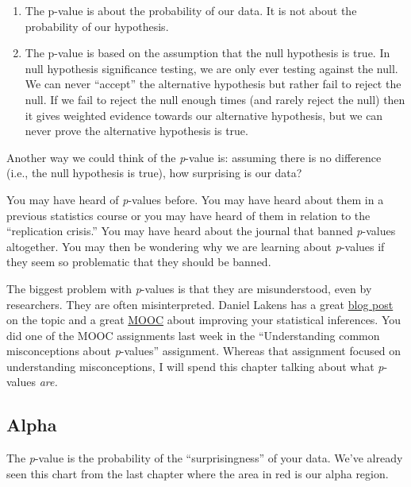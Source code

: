 \documentclass[
]{book}
\providecommand{\tightlist}{%
  \setlength{\itemsep}{0pt}\setlength{\parskip}{0pt}}
\begin{document}
\begin{enumerate}
\def\labelenumi{\arabic{enumi}.}
\tightlist
\item
  The p-value is about the probability of our data. It is not about the probability of our hypothesis.
\item
  The p-value is based on the assumption that the null hypothesis is true. In null hypothesis significance testing, we are only ever testing against the null. We can never ``accept'' the alternative hypothesis but rather fail to reject the null. If we fail to reject the null enough times (and rarely reject the null) then it gives weighted evidence towards our alternative hypothesis, but we can never prove the alternative hypothesis is true.
\end{enumerate}

Another way we could think of the \emph{p}-value is: assuming there is no difference (i.e., the null hypothesis is true), how surprising is our data?

You may have heard of \emph{p}-values before. You may have heard about them in a previous statistics course or you may have heard of them in relation to the ``replication crisis.'' You may have heard about the journal that banned \emph{p}-values altogether. You may then be wondering why we are learning about \emph{p}-values if they seem so problematic that they should be banned.

The biggest problem with \emph{p}-values is that they are misunderstood, even by researchers. They are often misinterpreted. Daniel Lakens has a great \href{http://daniellakens.blogspot.com/2017/12/understanding-common-misconceptions.html}{blog post} on the topic and a great \href{https://www.coursera.org/learn/statistical-inferences}{MOOC} about improving your statistical inferences. You did one of the MOOC assignments last week in the ``Understanding common misconceptions about \emph{p}-values'' assignment. Whereas that assignment focused on understanding misconceptions, I will spend this chapter talking about what \emph{p}-values \emph{are.}

\hypertarget{alpha}{%
\subsection{Alpha}\label{alpha}}

The \emph{p}-value is the probability of the ``surprisingness'' of your data. We've already seen this chart from the last chapter where the area in red is our alpha region.
\end{document}
